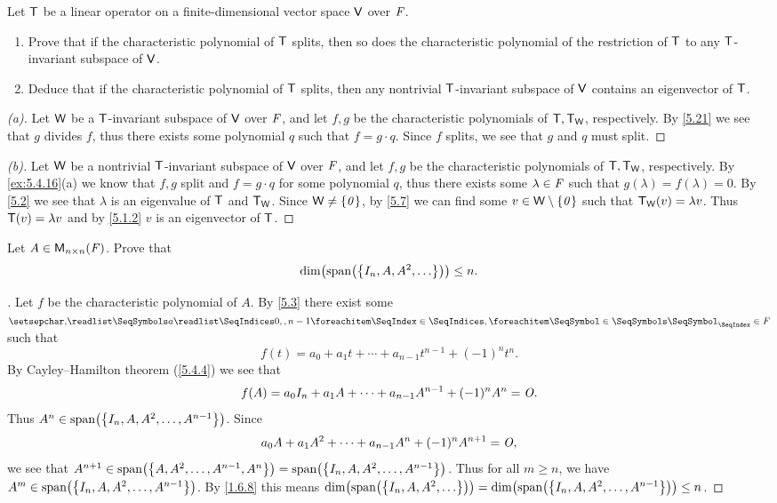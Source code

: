 \setcounter{ex}{15}
\begin{ex}\label{ex:5.4.16}
	Let \(\mathsf{T}\) be a linear operator on a finite-dimensional vector space \(\mathsf{V}\) over \(\mathit{F}\).
	\begin{enumerate}
		\item Prove that if the characteristic polynomial of \(\mathsf{T}\) splits, then so does the characteristic polynomial of the restriction of \(\mathsf{T}\) to any \(\mathsf{T}\)-invariant subspace of \(\mathsf{V}\).
		\item Deduce that if the characteristic polynomial of \(\mathsf{T}\) splits, then any nontrivial \(\mathsf{T}\)-invariant subspace of \(\mathsf{V}\) contains an eigenvector of \(\mathsf{T}\).
	\end{enumerate}
\end{ex}

\begin{proof}[(a)]
	Let \(\mathsf{W}\) be a \(\mathsf{T}\)-invariant subspace of \(\mathsf{V}\) over \(\mathit{F}\), and let \(f, g\) be the characteristic polynomials of \(\mathsf{T}, \mathsf{T}_{\mathsf{W}}\), respectively.
	By \cref{5.21} we see that \(g\) divides \(f\), thus there exists some polynomial \(q\) such that \(f = g \cdot q\).
	Since \(f\) splits, we see that \(g\) and \(q\) must split.
\end{proof}

\begin{proof}[(b)]
	Let \(\mathsf{W}\) be a nontrivial \(\mathsf{T}\)-invariant subspace of \(\mathsf{V}\) over \(\mathit{F}\), and let \(f, g\) be the characteristic polynomials of \(\mathsf{T}, \mathsf{T}_{\mathsf{W}}\), respectively.
	By \cref{ex:5.4.16}(a) we know that \(f, g\) split and \(f = g \cdot q\) for some polynomial \(q\), thus there exists some \(\lambda \in \mathit{F}\) such that \(g(\lambda) = f(\lambda) = 0\).
	By \cref{5.2} we see that \(\lambda\) is an eigenvalue of \(\mathsf{T}\) and \(\mathsf{T}_{\mathsf{W}}\).
	Since \(\mathsf{W} \neq \left\lbrace\mathit{0}\right\rbrace\), by \cref{5.7} we can find some \(v \in \mathsf{W} \setminus \left\lbrace\mathit{0}\right\rbrace\) such that \(\mathsf{T}_{\mathsf{W}}(v) = \lambda v\).
	Thus \(\mathsf{T}(v) = \lambda v\) and by \cref{5.1.2} \(v\) is an eigenvector of \(\mathsf{T}\).
\end{proof}

\begin{ex}\label{ex:5.4.17}
	Let \(A \in \mathsf{M}_{{n} \times n}({\mathit{F}})\).
	Prove that
	\[
		\dim\pa{\spn{\set{I_n, A, A^2, \dots}}} \leq n.
	\]
\end{ex}

\begin{proof}[]
	Let \(f\) be the characteristic polynomial of \(A\).
	By \cref{5.3} there exist some \(\seq{a}{0,,n-1} \in \F\) such that
	\[
		f(t) = a_0 + a_1 t + \cdots + a_{n - 1} t^{n - 1} + (-1)^n t^n.
	\]
	By Cayley--Hamilton theorem (\cref{5.4.4}) we see that
	\[
		f(A) = a_0 I_n + a_1 A + \cdots + a_{n - 1} A^{n - 1} + (-1)^n A^n = \mathit{O}.
	\]
	Thus \(A^n \in \spn{\set{I_n, A, A^2, \dots, A^{n - 1}}}\).
	Since
	\[
		a_0 A + a_1 A^2 + \cdots + a_{n - 1} A^n + (-1)^n A^{n + 1} = \mathit{O},
	\]
	we see that \(A^{n + 1} \in \spn{\set{A, A^2, \dots, A^{n - 1}, A^n}} = \spn{\set{I_n, A, A^2, \dots, A^{n - 1}}}\).
	Thus for all \(m \geq n\), we have \(A^m \in \spn{\set{I_n, A, A^2, \dots, A^{n - 1}}}\).
	By \cref{1.6.8} this means \(\dim\pa{\spn{\set{I_n, A, A^2, \dots}}} = \dim\pa{\spn{\set{I_n, A, A^2, \dots, A^{n - 1}}}} \leq n\).
\end{proof}

